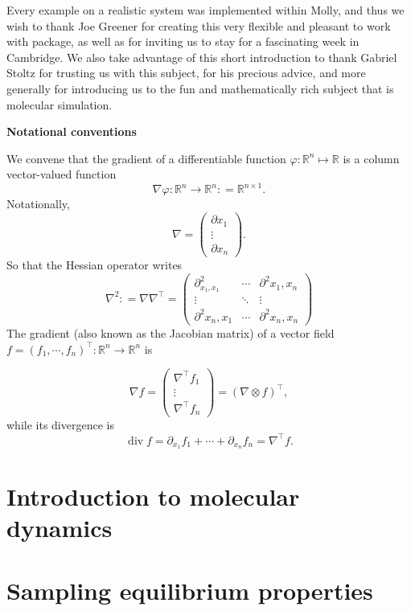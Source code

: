 \documentclass[a4paper,10pt,twoside]{report}
\newcommand{\R}{\mathbb{R}}
\newcommand{\defeq}{\mathrel{\mathop:}=}
\newcommand{\1}{\mathbbm{1}}
\begin{document}
Every example on a realistic system was implemented within Molly, and thus we wish to thank Joe Greener for creating this very flexible and pleasant to work with package,
 as well as for inviting us to stay for a fascinating week in Cambridge.
We also take advantage of this short introduction to thank Gabriel Stoltz for trusting us with this subject, for his precious advice, and more generally for introducing us to the fun and mathematically rich subject that is molecular simulation.
\newpage

\begin{center}
  \textbf{Notational conventions}
\end{center}
We convene that the gradient of a differentiable function $\varphi : \R^n \mapsto \R$ is a column vector-valued function
$$\nabla \varphi : \R^n \to \R^n \defeq \R^{n\times 1}.$$
Notationally,
$$\nabla = \begin{pmatrix} \partial x_1 \\ \vdots \\ \partial x_n\end{pmatrix}.$$
So that the Hessian operator writes
$$\nabla^2 \defeq \nabla\nabla^\intercal = \begin{pmatrix}
\partial^2_{x_1,x_1} & \dotsm & \partial^2{x_1,x_n}\\
 \vdots & \ddots & \vdots \\
 \partial^2{x_n,x_1} & \dotsm & \partial^2{x_n,x_n}    
\end{pmatrix}$$
The gradient (also known as the Jacobian matrix) of a vector field $f=(f_1,\dotsm, f_n)^\intercal: \R^n \to \R^n$ is

\begin{equation}
  \label{eq:jacobian}
    \nabla f=\begin{pmatrix}
        \nabla^\intercal f_1 \\ \vdots \\ \nabla^\intercal f_n
    \end{pmatrix}=(\nabla \otimes f)^\intercal,
\end{equation}
while its divergence is 
\[\operatorname{div} f=\partial_{x_1}f_1+\dotsm+\partial_{x_n}f_n=\nabla^\intercal f.\]

\tableofcontents

\chapter{Introduction to molecular dynamics}

\chapter{Sampling equilibrium properties}

\end{document}
